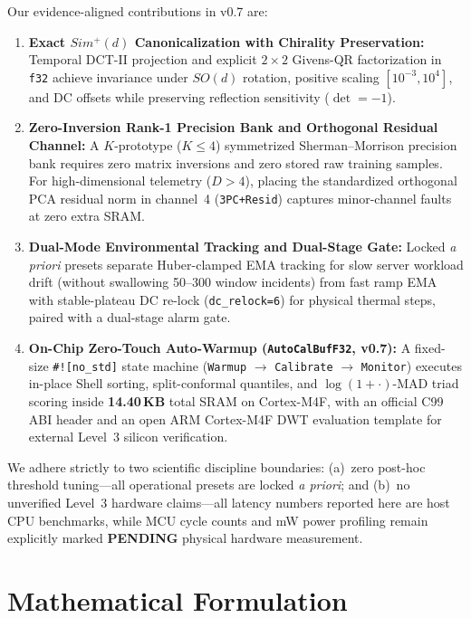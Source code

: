 \documentclass[conference]{IEEEtran}
\begin{document}
Our evidence-aligned contributions in v0.7 are:
\begin{enumerate}
  \item \textbf{Exact $Sim^+(d)$ Canonicalization with Chirality Preservation:} Temporal DCT-II projection and explicit $2\times 2$ Givens-QR factorization in \texttt{f32} achieve invariance under $SO(d)$ rotation, positive scaling $[10^{-3}, 10^4]$, and DC offsets while preserving reflection sensitivity ($\det=-1$).
  \item \textbf{Zero-Inversion Rank-1 Precision Bank and Orthogonal Residual Channel:} A $K$-prototype ($K \le 4$) symmetrized Sherman--Morrison precision bank requires zero matrix inversions and zero stored raw training samples. For high-dimensional telemetry ($D > 4$), placing the standardized orthogonal PCA residual norm in channel~4 (\texttt{3PC+Resid}) captures minor-channel faults at zero extra SRAM.
  \item \textbf{Dual-Mode Environmental Tracking and Dual-Stage Gate:} Locked \emph{a priori} presets separate Huber-clamped EMA tracking for slow server workload drift (without swallowing 50--300 window incidents) from fast ramp EMA with stable-plateau DC re-lock (\texttt{dc\_relock=6}) for physical thermal steps, paired with a dual-stage alarm gate.
  \item \textbf{On-Chip Zero-Touch Auto-Warmup (\texttt{AutoCalBufF32}, v0.7):} A fixed-size \texttt{\#![no\_std]} state machine (\texttt{Warmup} $\to$ \texttt{Calibrate} $\to$ \texttt{Monitor}) executes in-place Shell sorting, split-conformal quantiles, and $\log(1+\cdot)$-MAD triad scoring inside \textbf{14.40\,KB} total SRAM on Cortex-M4F, with an official C99 ABI header and an open ARM Cortex-M4F DWT evaluation template for external Level~3 silicon verification.
\end{enumerate}

We adhere strictly to two scientific discipline boundaries: (a)~zero post-hoc threshold tuning---all operational presets are locked \emph{a priori}; and (b)~no unverified Level~3 hardware claims---all latency numbers reported here are host CPU benchmarks, while MCU cycle counts and mW power profiling remain explicitly marked \textbf{PENDING} physical hardware measurement.

\section{Mathematical Formulation}
\end{document}
